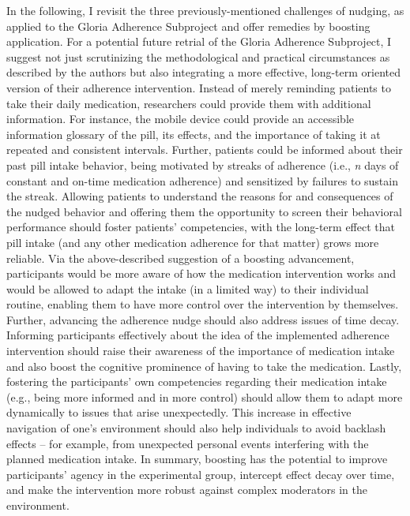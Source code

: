 \documentclass[reflection, authordate]{jote-new-article}
\begin{document}
In the following, I revisit the three previously-mentioned challenges of nudging, as applied to the Gloria Adherence Subproject and offer remedies by boosting application. For a potential future retrial of the Gloria Adherence Subproject, I suggest not just scrutinizing the methodological and practical circumstances as described by the authors but also integrating a more effective, long-term oriented version of their adherence intervention. Instead of merely reminding patients to take their daily medication, researchers could provide them with additional information. For instance, the mobile device could provide an accessible information glossary of the pill, its effects, and the importance of taking it at repeated and consistent intervals. Further, patients could be informed about their past pill intake behavior, being motivated by streaks of adherence (i.e., \emph{n }days of constant and on-time medication adherence) and sensitized by failures to sustain the streak. Allowing patients to understand the reasons for and consequences of the nudged behavior and offering them the opportunity to screen their behavioral performance should foster patients’ competencies, with the long-term effect that pill intake (and any other medication adherence for that matter) grows more reliable. Via the above-described suggestion of a boosting advancement, participants would be more aware of how the medication intervention works and would be allowed to adapt the intake (in a limited way) to their individual routine, enabling them to have more control over the intervention by themselves. Further, advancing the adherence nudge should also address issues of time decay. Informing participants effectively about the idea of the implemented adherence intervention should raise their awareness of the importance of medication intake and also boost the cognitive prominence of having to take the medication. Lastly, fostering the participants’ own competencies regarding their medication intake (e.g., being more informed and in more control) should allow them to adapt more dynamically to issues that arise unexpectedly. This increase in effective navigation of one’s environment should also help individuals to avoid backlash effects – for example, from unexpected personal events interfering with the planned medication intake. In summary, boosting has the potential to improve participants’ agency in the experimental group, intercept effect decay over time, and make the intervention more robust against complex moderators in the environment.
\end{document}
